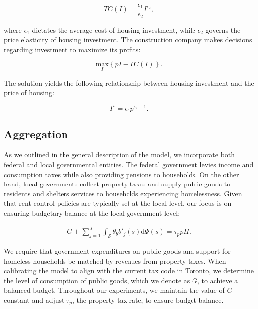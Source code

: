 \documentclass[parskip=full]{article}
\begin{document}
\begin{equation*}
TC(I)=\frac{\epsilon_{1}}{\epsilon_{2}}I^{\epsilon_{2}}\label{eq:total_cost_structure},
\end{equation*}

\noindent where $\epsilon_{1}$ dictates the average cost of housing investment, while $\epsilon_{2}$ governs the price elasticity of housing investment. The construction company makes decisions regarding investment to maximize its profits:

\begin{equation*}
\label{eq:construction_company_profits}
\underset{I} {\text{$\mbox{max}$}}{\left\{p I-TC(I)\right\}}.
\end{equation*}

\noindent The solution yields the following relationship between housing investment and the price of housing:

\begin{equation}
\label{eq:construction_company_first_order_condition}
I^{\star}=\epsilon_{1} p^{\epsilon_{2}-1}.
\end{equation}

\subsection{Aggregation}\label{subsection:aggregation}

As we outlined in the general description of the model, we incorporate both federal and local governmental entities. The federal government levies income and consumption taxes while also providing pensions to households. On the other hand, local governments collect property taxes and supply public goods to residents and shelters services to households experiencing homelessness. Given that rent-control policies are typically set at the local level, our focus is on ensuring budgetary balance at the local government level:

\begin{align}\label{eq:gbc}
  G + \sum_{j=1}^J \int_\mathcal{S} \theta_{b} b'_{j}(s)\mathrm{d}\Psi(s)  = \tau_{p} p H.
\end{align}

\noindent We require that government expenditures on public goods and support for homeless households be matched by revenues from property taxes. When calibrating the model to align with the current tax code in Toronto, we determine the level of consumption of public goods, which we denote as $G$, to achieve a balanced budget. Throughout our experiments, we maintain the value of $G$ constant and adjust $\tau_{p}$, the property tax rate, to ensure budget balance.%
\end{document}
